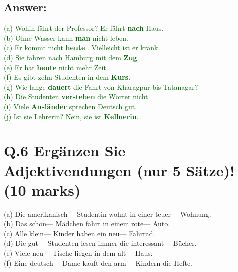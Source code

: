 \documentclass[a4paper,12pt]{article}
\begin{document}
\subsection*{Answer:}
\textcolor{darkgreen}{(a) Wohin fährt der Professor? Er fährt \textbf{nach} Haus.}\\
\textcolor{darkgreen}{(b) Ohne Wasser kann \textbf{man} nicht leben.}\\
\textcolor{darkgreen}{(c) Er kommt nicht \textbf{heute} . Vielleicht ist er krank.}\\
\textcolor{darkgreen}{(d) Sie fahren nach Hamburg mit dem \textbf{Zug}.}\\
\textcolor{darkgreen}{(e) Er hat \textbf{heute} nicht mehr Zeit.}\\
\textcolor{darkgreen}{(f) Es gibt zehn Studenten in dem \textbf{Kurs}.}\\
\textcolor{darkgreen}{(g) Wie lange \textbf{dauert} die Fahrt von Kharagpur bis Tatanagar?}\\
\textcolor{darkgreen}{(h) Die Studenten \textbf{verstehen} die Wörter nicht.}\\
\textcolor{darkgreen}{(i) Viele \textbf{Ausländer} sprechen Deutsch gut.}\\
\textcolor{darkgreen}{(j) Ist sie Lehrerin? Nein, sie ist \textbf{Kellnerin}.}\\

\vspace{1cm}

\section*{Q.6 Ergänzen Sie Adjektivendungen (nur 5 Sätze)! (10 marks)}

(a) Die amerikanisch--- Studentin wohnt in einer teuer--- Wohnung.\\
(b) Das schön--- Mädchen fährt in einem rote--- Auto.\\
(c) Alle klein--- Kinder haben ein neu--- Fahrrad.\\
(d) Die gut--- Studenten lesen immer die interessant--- Bücher.\\
(e) Viele neu--- Tische liegen in dem alt--- Haus.\\
(f) Eine deutsch--- Dame kauft den arm--- Kindern die Hefte.
\end{document}
